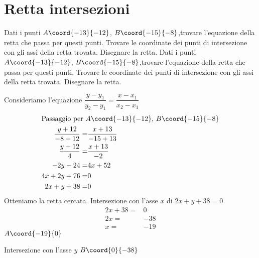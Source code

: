 \section{Retta intersezioni}
\begin{exercise}
	Dati i punti  $A\coord{-13}{-12}$, $B\coord{-15}{-8}$,trovare l'equazione della retta che passa per questi punti. Trovare le coordinate dei punti di intersezione con gli assi della retta trovata. Disegnare la retta.
	\tcblower
	Dati i punti  $A\coord{-13}{-12}$, $B\coord{-15}{-8}$,trovare l'equazione della retta che passa per questi punti. Trovare le coordinate dei punti di intersezione con gli assi della retta trovata. Disegnare la retta.
	
	Consideriamo l'equazione  $\dfrac{y-y_1}{y_2-y_1}=\dfrac{x-x_1}{x_2-x_1}$
	\begin{align*}
		\intertext{Passaggio per  $A\coord{-13}{-12}$, $B\coord{-15}{-8}$}
		\dfrac{y+12}{-8+12}=&\dfrac{x+13}{-15+13}\\
		\dfrac{y+12}{4}=&\dfrac{x+13}{-2}\\
		-2y-24=&4x+52\\
		4x+2y+76=&0\\
		2x+y+38=&0\\
	\end{align*}
	Otteniamo la retta cercata.
	Intersezione con l'asse $x$ di $2x+y+38=0$
	\begin{align*}
		2x+38=&0\\
		2x=&-38\\
		x=&-19
	\end{align*}
	$A\coord{-19}{0}$
	
	Intersezione con l'asse $y$
	$B\coord{0}{-38}$
	\begin{center}
		
	\end{center}
\end{exercise}
